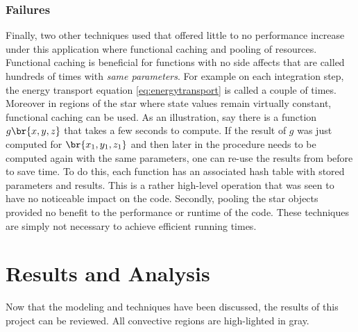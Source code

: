 \documentclass[11pt]{article}
\begin{document}
    \subsubsection{Failures}
    Finally, two other techniques used that offered little to no performance increase under this application where functional caching and pooling of resources. Functional caching is beneficial for functions with no side affects that are called hundreds of times with \textit{same parameters}. For example on each integration step, the energy transport equation \eqref{eq:energytransport} is called a couple of times. Moreover in regions of the star where state values remain virtually constant, functional caching can be used. As an illustration, say there is a function $g\br{x,y,z}$ that takes a few seconds to compute. If the result of $g$ was just computed for $\br{x_1,y_1,z_1}$ and then later in the procedure needs to be computed again with the same parameters, one can re-use the results from before to save time. To do this, each function has an associated hash table with stored parameters and results. This is a rather high-level operation that was seen to have no noticeable impact on the code. Secondly, pooling the star objects provided no benefit to the performance or runtime of the code. These techniques are simply not necessary to achieve efficient running times.
    \section{Results and Analysis}
    Now that the modeling and techniques have been discussed, the results of this project can be reviewed. All convective regions are high-lighted in gray.
\end{document}
